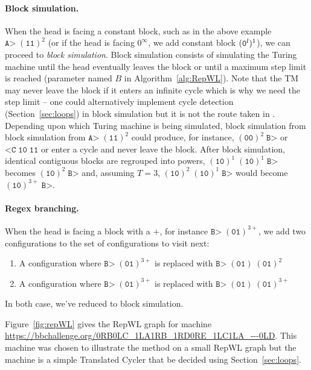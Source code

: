 \paragraph{Block simulation.} When the head is facing a constant block, such as in the above example $\texttt{A>} \; (\texttt{11})^2$ (or if the head is facing $0^\infty$, we add constant block $(\texttt{0}^l)^1$), we can proceed to \textit{block simulation}.
Block simulation consists of simulating the Turing machine until the head eventually leaves the block or until a maximum step limit is reached (parameter named $B$ in Algorithm~\ref{alg:RepWL}). Note that the TM may never leave the block if it enters an infinite cycle which is why we need the step limit -- one could alternatively implement cycle detection (Section~\ref{sec:loops}) in block simulation but it is not the route taken in \CoqBB. Depending upon which Turing machine is being simulated, block simulation from block simulation from $\texttt{A>} \; (\texttt{11})^2$ could produce, for instance, $(\texttt{00})^2 \; \texttt{B>}$ or $\texttt{<C} \; \texttt{10} \; \texttt{11} $ or enter a cycle and never leave the block. After block simulation, identical contiguous blocks are regrouped into powers, \eg $(\texttt{10})^1 \; (\texttt{10})^1 \; \texttt{B>}$ becomes $(\texttt{10})^2 \; \texttt{B>}$ and, assuming $T=3$, $(\texttt{10})^2\; (\texttt{10})^1\; \texttt{B>}$ would become $(\texttt{10})^{3+}\; \texttt{B>}$.

\paragraph{Regex branching.} When the head is facing a block with a $+$, for instance $\texttt{B>} \; (\texttt{01})^{3+}$, we add two configurations to the set of configurations to visit next:
\begin{enumerate}
    \item A configuration where $\texttt{B>} \; (\texttt{01})^{3+}$ is replaced with $\texttt{B>} \; (\texttt{01}) \; (\texttt{01})^{2}$
    \item A configuration where $\texttt{B>} \; (\texttt{01})^{3+}$ is replaced with  $\texttt{B>} \; (\texttt{01}) \; (\texttt{01})^{3+}$
\end{enumerate}
In both case, we've reduced to block simulation.

\begin{example}
    Figure~\ref{fig:repWL} gives the RepWL graph for machine \url{https://bbchallenge.org/0RB0LC_1LA1RB_1RD0RE_1LC1LA_---0LD}. This machine was chosen to illustrate the method on a small RepWL graph but the machine is a simple Translated Cycler that be decided using Section~\ref{sec:loops}.
\end{example}

